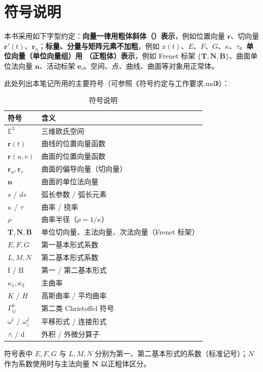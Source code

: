 \section{符号说明}
\label{sec:符号说明}

本书采用如下字型约定：\textbf{向量一律用粗体斜体（$\boldsymbol{}$）表示}，例如位置向量 $\boldsymbol{r}$、切向量 $\boldsymbol{r}'(t)$、$\boldsymbol{r}_u$；\textbf{标量、分量与矩阵元素不加粗}，例如 $x(t)$、$E$、$F$、$G$、$\kappa$、$\tau$。\textbf{单位向量（单位向量组）用 $\mathbf{}$（正粗体）表示}，例如 Frenet 标架 $\{\mathbf{T},\mathbf{N},\mathbf{B}\}$、曲面单位法向量 $\mathbf{n}$、活动标架 $\mathbf{e}_i$。空间、点、曲线、曲面等对象用正常体。

此处列出本笔记所用的主要符号（可参照《符号约定与工作要求.md》）：

\begin{table}[H]
\centering
\caption{符号说明}
\label{tab:符号说明}
\begin{tabular}{ll}
\toprule
符号 & 含义 \\
\midrule
$\mathbb{E}^3$ & 三维欧氏空间 \\
$\boldsymbol{r}(t)$ & 曲线的位置向量函数 \\
$\boldsymbol{r}(u,v)$ & 曲面的位置向量函数 \\
$\boldsymbol{r}_u,\boldsymbol{r}_v$ & 曲面的偏导向量（切向量） \\
$\mathbf{n}$ & 曲面的单位法向量 \\
$s$ / $ds$ & 弧长参数 / 弧长元素 \\
$\kappa$ / $\tau$ & 曲率 / 挠率 \\
$\rho$ & 曲率半径（$\rho=1/\kappa$） \\
$\mathbf{T},\mathbf{N},\mathbf{B}$ & 单位切向量、主法向量、次法向量（Frenet 标架） \\
$E,F,G$ & 第一基本形式系数 \\
$L,M,N$ & 第二基本形式系数 \\
$\mathrm{I}$ / $\mathrm{II}$ & 第一 / 第二基本形式 \\
$\kappa_1,\kappa_2$ & 主曲率 \\
$K$ / $H$ & 高斯曲率 / 平均曲率 \\
$\Gamma_{ij}^{k}$ & 第二类 Christoffel 符号 \\
$\omega^{i}$ / $\omega_{i}^{j}$ & 平移形式 / 连接形式 \\
$\wedge$ / $\mathrm{d}$ & 外积 / 外微分算子 \\
\bottomrule
\end{tabular}
\end{table}

符号表中 $E,F,G$ 与 $L,M,N$ 分别为第一、第二基本形式的系数（标准记号）；$N$ 作为系数使用时与主法向量 $\mathbf{N}$ 以正粗体区分。
